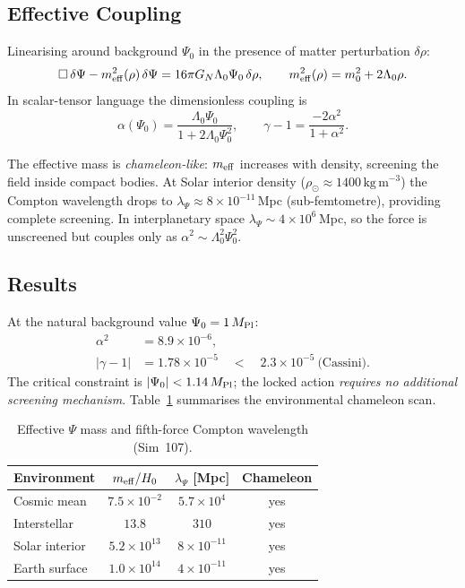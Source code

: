 \documentclass[12pt,a4paper]{article}
\begin{document}
\subsection{Effective Coupling}

Linearising around background $\Psi_0$ in the presence of matter perturbation
$\delta\rho$:
\[
  \Box\,\delta\Psi - m_{\rm eff}^2(\rho)\,\delta\Psi
  = 16\pi G_N \Lambda_0\Psi_0\,\delta\rho ,
  \qquad
  m_{\rm eff}^2(\rho) = m_0^2 + 2\Lambda_0\rho .
\]
In scalar-tensor language the dimensionless coupling is
\[
  \alpha(\Psi_0) = \frac{\Lambda_0\Psi_0}{1+2\Lambda_0\Psi_0^2},
  \qquad
  \gamma - 1 = \frac{-2\alpha^2}{1+\alpha^2}.
\]

The effective mass is \emph{chameleon-like}: $m_{\rm eff}$ increases with
density, screening the field inside compact bodies.  At Solar interior density
($\rho_\odot\approx1400\,\mathrm{kg\,m^{-3}}$) the Compton wavelength drops to
$\lambda_\Psi\approx8\times10^{-11}$\,Mpc (sub-femtometre), providing complete
screening.  In interplanetary space $\lambda_\Psi\sim4\times10^6$\,Mpc, so
the force is unscreened but couples only as $\alpha^2\sim\Lambda_0^2\Psi_0^2$.

\subsection{Results}

At the natural background value $\Psi_0 = 1\,M_{\rm Pl}$:
\begin{align*}
  \alpha^2 &= 8.9\times10^{-6}, \\
  |\gamma-1| &= 1.78\times10^{-5} \quad < \quad 2.3\times10^{-5}\ \text{(Cassini)}.
\end{align*}
The critical constraint is $|\Psi_0|<1.14\,M_{\rm Pl}$; the locked action
\emph{requires no additional screening mechanism}.
Table~\ref{tab:sim107} summarises the environmental chameleon scan.

\begin{table}[h]
\centering
\caption{Effective $\Psi$ mass and fifth-force Compton wavelength (Sim~107).}
\label{tab:sim107}
\begin{tabular}{lccc}
\hline
Environment & $m_{\rm eff}/H_0$ & $\lambda_\Psi$ [Mpc] & Chameleon \\
\hline
Cosmic mean   & $7.5\times10^{-2}$  & $5.7\times10^{4}$ & yes \\
Interstellar  & $13.8$              & $310$             & yes \\
Solar interior& $5.2\times10^{13}$  & $8\times10^{-11}$ & yes \\
Earth surface & $1.0\times10^{14}$  & $4\times10^{-11}$ & yes \\
\hline
\end{tabular}
\end{table}
\end{document}
